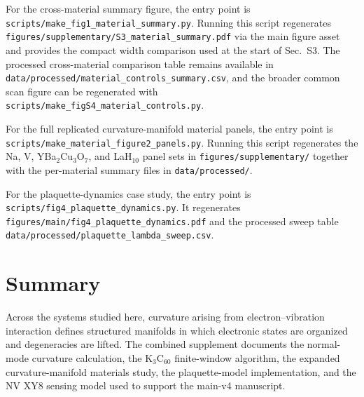\documentclass[12pt]{article}
\begin{document}
For the cross-material summary figure, the entry point is
\texttt{scripts/make\_fig1\_material\_summary.py}. Running this script
regenerates \texttt{figures/supplementary/S3\_material\_summary.pdf} via the
main figure asset and provides the compact width comparison used at the start of
Sec.~S3. The processed cross-material comparison table remains available in
\texttt{data/processed/material\_controls\_summary.csv}, and the broader common
scan figure can be regenerated with
\texttt{scripts/make\_figS4\_material\_controls.py}.

For the full replicated curvature-manifold material panels, the entry point is
\texttt{scripts/make\_material\_figure2\_panels.py}. Running this script
regenerates the Na, V, YBa$_2$Cu$_3$O$_7$, and LaH$_{10}$ panel sets in
\texttt{figures/supplementary/} together with the per-material summary files in
\texttt{data/processed/}.

For the plaquette-dynamics case study, the entry point is
\texttt{scripts/fig4\_plaquette\_dynamics.py}. It regenerates
\texttt{figures/main/fig4\_plaquette\_dynamics.pdf} and the processed sweep
table \texttt{data/processed/plaquette\_lambda\_sweep.csv}.

\section*{Summary}

Across the systems studied here, curvature arising from electron--vibration
interaction defines structured manifolds in which electronic states are
organized and degeneracies are lifted. The combined supplement documents the
normal-mode curvature calculation, the K$_3$C$_{60}$ finite-window algorithm,
the expanded curvature-manifold materials study, the plaquette-model
implementation, and the NV XY8 sensing model used to support the main-v4
manuscript.



\end{document}
